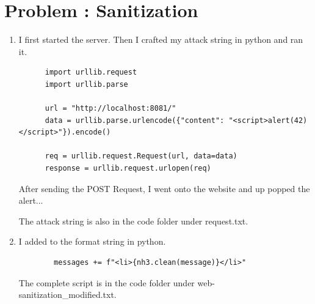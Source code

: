 \documentclass[12pt]{scrartcl}
\newcounter{exnum}
\newcommand{\exercise}[1]{\section*{Problem \theexnum\stepcounter{exnum}: #1}}
\begin{document}
\setcounter{exnum}{1}
\exercise{Sanitization}
\begin{enumerate}
  \item
    I first started the server. Then I crafted my attack string in python and ran it.
    \begin{lstlisting}
      import urllib.request
      import urllib.parse

      url = "http://localhost:8081/"
      data = urllib.parse.urlencode({"content": "<script>alert(42)</script>"}).encode()

      req = urllib.request.Request(url, data=data)
      response = urllib.request.urlopen(req)
    \end{lstlisting}

    After sending the POST Request, I went onto the website and up popped the alert...
    
    The attack string is also in the code folder under request.txt.

    \item
      I added to the format string in python.
      \begin{lstlisting}
        messages += f"<li>{nh3.clean(message)}</li>"
      \end{lstlisting}
      The complete script is in the code folder under web-sanitization_modified.txt.
\end{enumerate}
\end{document}
